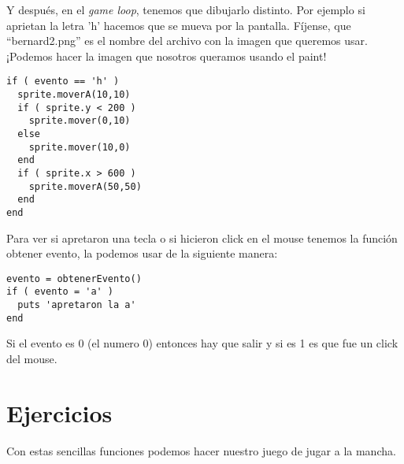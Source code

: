Y después, en el \emph{game loop}, tenemos que dibujarlo distinto. Por ejemplo si aprietan la letra 'h' hacemos que se mueva por la pantalla. Fíjense, que “bernard2.png” es el nombre del archivo con la imagen que queremos usar. ¡Podemos hacer la imagen que nosotros queramos usando el paint!
\begin{lstlisting}
if ( evento == 'h' )
  sprite.moverA(10,10)
  if ( sprite.y < 200 )
    sprite.mover(0,10)
  else
    sprite.mover(10,0)
  end
  if ( sprite.x > 600 )
    sprite.moverA(50,50)
  end
end
\end{lstlisting}

Para ver si apretaron una tecla o  si hicieron click en el mouse tenemos la función obtener evento, la podemos usar de la siguiente manera:
\begin{lstlisting}
evento = obtenerEvento()
if ( evento = 'a' )
  puts 'apretaron la a'
end
\end{lstlisting}
Si el evento es 0 (el numero 0) entonces hay que salir y si es 1 es que fue un click del mouse.

\section{Ejercicios}
Con estas sencillas funciones podemos hacer nuestro juego de jugar a la mancha.
